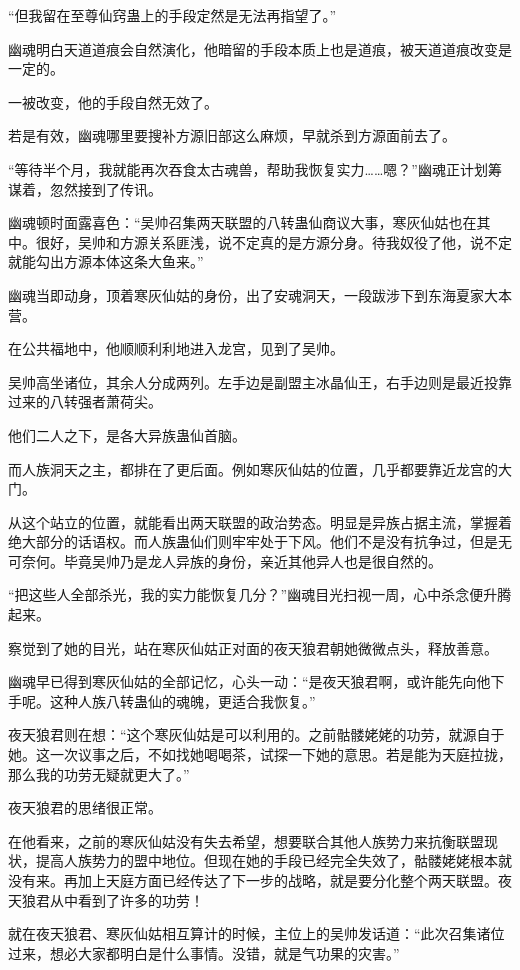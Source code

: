 \begin{this_body}
“但我留在至尊仙窍蛊上的手段定然是无法再指望了。”

幽魂明白天道道痕会自然演化，他暗留的手段本质上也是道痕，被天道道痕改变是一定的。

一被改变，他的手段自然无效了。

若是有效，幽魂哪里要搜补方源旧部这么麻烦，早就杀到方源面前去了。

“等待半个月，我就能再次吞食太古魂兽，帮助我恢复实力……嗯？”幽魂正计划筹谋着，忽然接到了传讯。

幽魂顿时面露喜色：“吴帅召集两天联盟的八转蛊仙商议大事，寒灰仙姑也在其中。很好，吴帅和方源关系匪浅，说不定真的是方源分身。待我奴役了他，说不定就能勾出方源本体这条大鱼来。”

幽魂当即动身，顶着寒灰仙姑的身份，出了安魂洞天，一段跋涉下到东海夏家大本营。

在公共福地中，他顺顺利利地进入龙宫，见到了吴帅。

吴帅高坐诸位，其余人分成两列。左手边是副盟主冰晶仙王，右手边则是最近投靠过来的八转强者萧荷尖。

他们二人之下，是各大异族蛊仙首脑。

而人族洞天之主，都排在了更后面。例如寒灰仙姑的位置，几乎都要靠近龙宫的大门。

从这个站立的位置，就能看出两天联盟的政治势态。明显是异族占据主流，掌握着绝大部分的话语权。而人族蛊仙们则牢牢处于下风。他们不是没有抗争过，但是无可奈何。毕竟吴帅乃是龙人异族的身份，亲近其他异人也是很自然的。

“把这些人全部杀光，我的实力能恢复几分？”幽魂目光扫视一周，心中杀念便升腾起来。

察觉到了她的目光，站在寒灰仙姑正对面的夜天狼君朝她微微点头，释放善意。

幽魂早已得到寒灰仙姑的全部记忆，心头一动：“是夜天狼君啊，或许能先向他下手呢。这种人族八转蛊仙的魂魄，更适合我恢复。”

夜天狼君则在想：“这个寒灰仙姑是可以利用的。之前骷髅姥姥的功劳，就源自于她。这一次议事之后，不如找她喝喝茶，试探一下她的意思。若是能为天庭拉拢，那么我的功劳无疑就更大了。”

夜天狼君的思绪很正常。

在他看来，之前的寒灰仙姑没有失去希望，想要联合其他人族势力来抗衡联盟现状，提高人族势力的盟中地位。但现在她的手段已经完全失效了，骷髅姥姥根本就没有来。再加上天庭方面已经传达了下一步的战略，就是要分化整个两天联盟。夜天狼君从中看到了许多的功劳！

就在夜天狼君、寒灰仙姑相互算计的时候，主位上的吴帅发话道：“此次召集诸位过来，想必大家都明白是什么事情。没错，就是气功果的灾害。”


\end{this_body}
